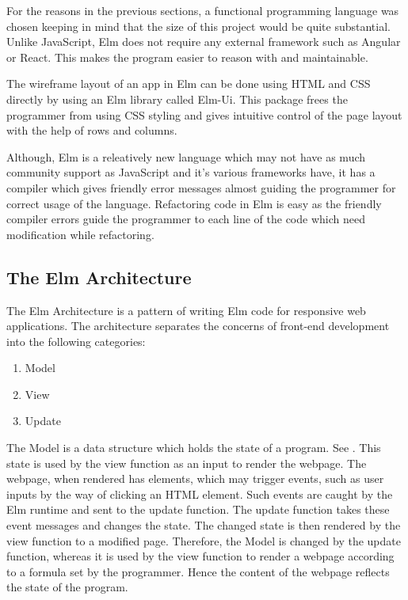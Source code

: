 For the reasons in the previous sections, a functional programming language was
chosen keeping in mind that the size of this project would be quite
substantial.  Unlike JavaScript, Elm does not require any external framework
such as Angular or React. This makes the program easier to reason with and
maintainable.

The wireframe layout of an app in Elm can be done using HTML and CSS directly
by using an Elm library called Elm-Ui. This package frees the programmer
from using CSS styling and gives intuitive control of the page layout with
the help of rows and columns.

Although, Elm is a releatively new language which may not have as much
community support as JavaScript and it's various frameworks have, it has a
compiler which gives friendly error messages almost guiding the programmer for
correct usage of the language. Refactoring code in Elm is easy as the friendly
compiler errors guide the programmer to each line of the code which need
modification while refactoring.


\subsection{The Elm Architecture}
\label{elm: architecture}
The Elm Architecture is a pattern of writing Elm code for responsive web
applications.  The architecture separates the concerns of front-end development
into the following categories:

\begin{enumerate}
\item Model
\item View
\item Update
\end{enumerate}

The Model is a data structure which holds the state of a program. See
\cite{Fairbank19}. This state is used by the view function as an input to
render the webpage.  The webpage, when rendered has elements, which may trigger
events, such as user inputs by the way of clicking an HTML element. Such events
are caught by the Elm runtime and sent to the update function.  The update
function takes these event messages and changes the state. The changed state is
then rendered by the view function to a modified page.  Therefore, the Model is
changed by the update function, whereas it is used by the view function to
render a webpage according to a formula set by the programmer. Hence the content
of the webpage reflects the state of the program.


